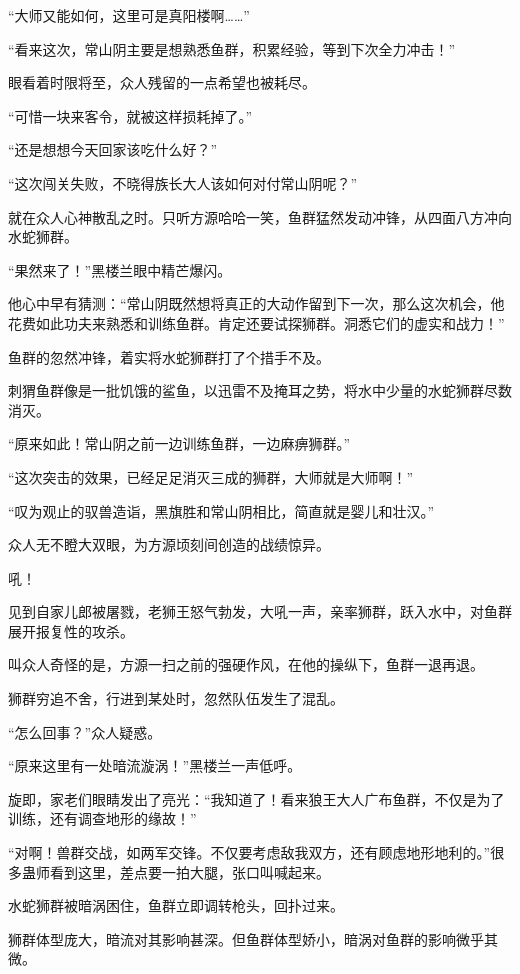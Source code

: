 \begin{this_body}
“大师又能如何，这里可是真阳楼啊……”

“看来这次，常山阴主要是想熟悉鱼群，积累经验，等到下次全力冲击！”

眼看着时限将至，众人残留的一点希望也被耗尽。

“可惜一块来客令，就被这样损耗掉了。”

“还是想想今天回家该吃什么好？”

“这次闯关失败，不晓得族长大人该如何对付常山阴呢？”

就在众人心神散乱之时。只听方源哈哈一笑，鱼群猛然发动冲锋，从四面八方冲向水蛇狮群。

“果然来了！”黑楼兰眼中精芒爆闪。

他心中早有猜测：“常山阴既然想将真正的大动作留到下一次，那么这次机会，他花费如此功夫来熟悉和训练鱼群。肯定还要试探狮群。洞悉它们的虚实和战力！”

鱼群的忽然冲锋，着实将水蛇狮群打了个措手不及。

刺猬鱼群像是一批饥饿的鲨鱼，以迅雷不及掩耳之势，将水中少量的水蛇狮群尽数消灭。

“原来如此！常山阴之前一边训练鱼群，一边麻痹狮群。”

“这次突击的效果，已经足足消灭三成的狮群，大师就是大师啊！”

“叹为观止的驭兽造诣，黑旗胜和常山阴相比，简直就是婴儿和壮汉。”

众人无不瞪大双眼，为方源顷刻间创造的战绩惊异。

吼！

见到自家儿郎被屠戮，老狮王怒气勃发，大吼一声，亲率狮群，跃入水中，对鱼群展开报复性的攻杀。

叫众人奇怪的是，方源一扫之前的强硬作风，在他的操纵下，鱼群一退再退。

狮群穷追不舍，行进到某处时，忽然队伍发生了混乱。

“怎么回事？”众人疑惑。

“原来这里有一处暗流漩涡！”黑楼兰一声低呼。

旋即，家老们眼睛发出了亮光：“我知道了！看来狼王大人广布鱼群，不仅是为了训练，还有调查地形的缘故！”

“对啊！兽群交战，如两军交锋。不仅要考虑敌我双方，还有顾虑地形地利的。”很多蛊师看到这里，差点要一拍大腿，张口叫喊起来。

水蛇狮群被暗涡困住，鱼群立即调转枪头，回扑过来。

狮群体型庞大，暗流对其影响甚深。但鱼群体型娇小，暗涡对鱼群的影响微乎其微。


\end{this_body}
